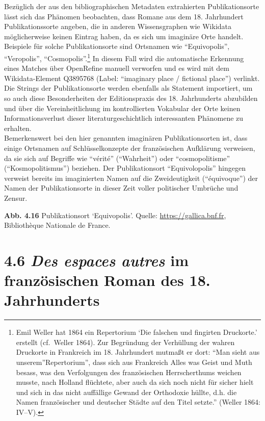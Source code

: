 \documentclass[
  12pt,
  letterpaper,
  DIV=11,
  numbers=noendperiod]{scrreprt}
\begin{document}
Bezüglich der aus den bibliographischen Metadaten extrahierten
Publikationsorte lässt sich das Phänomen beobachten, dass Romane aus dem
18. Jahrhundert Publikationssorte angeben, die in anderen Wissensgraphen
wie Wikidata möglicherweise keinen Eintrag haben, da es sich um
imaginäre Orte handelt. Beispiele für solche Publikationsorte sind
Ortsnamen wie ``Equivopolis'', ``Veropolis'', ``Cosmopolis''.\footnote{Emil
  Weller hat 1864 ein Repertorium `Die falschen und fingirten
  Druckorte.' erstellt (cf.~Weller 1864). Zur Begründung der Verhüllung
  der wahren Druckorte in Frankreich im 18. Jahrhundert mutmaßt er dort:
  ``Man sieht aus unserem''Repertorium'', dass sich aus Frankreich Alles
  was Geist und Muth besass, was den Verfolgungen des französischen
  Herrscherthums weichen musste, nach Holland flüchtete, aber auch da
  sich noch nicht für sicher hielt und sich in das nicht auffällige
  Gewand der Orthodoxie hüllte, d.h. die Namen französischer und
  deutscher Städte auf den Titel setzte.'' (Weller 1864: IV--V).} In
diesem Fall wird die automatische Erkennung eines Matches über
OpenRefine manuell verworfen und es wird mit dem Wikidata-Element
Q3895768 (Label: ``imaginary place / fictional place'') verlinkt.\\
Die Strings der Publikationsorte werden ebenfalls als Statement
importiert, um so auch diese Besonderheiten der Editionspraxis des 18.
Jahrhunderts abzubilden und über die Vereinheitlichung im kontrollierten
Vokabular der Orte keinen Informationsverlust dieser
literaturgeschichtlich interessanten Phänomene zu erhalten.\\
Bemerkenswert bei den hier genannten imaginären Publikationsorten ist,
dass einige Ortsnamen auf Schlüsselkonzepte der französischen Aufklärung
verweisen, da sie sich auf Begriffe wie ``vérité'' (``Wahrheit'') oder
``cosmopolitisme'' (``Kosmopolitismus'') beziehen. Der Publikationsort
``Equivolopolis'' hingegen verweist bereits im imaginierten Namen auf
die Zweideutigkeit (``équivoque'') der Namen der Publikationsorte in
dieser Zeit voller politischer Umbrüche und Zensur.

\textbf{Abb. 4.16} Publikationsort `Equivopolis'. Quelle:
\url{https://gallica.bnf.fr}, Bibliothèque Nationale de France.

\section{\texorpdfstring{4.6 \emph{Des espaces autres} im französischen
Roman des 18.
Jahrhunderts}{4.6 Des espaces autres im französischen Roman des 18. Jahrhunderts}}\label{des-espaces-autres-im-franzuxf6sischen-roman-des-18.-jahrhunderts}
\end{document}
